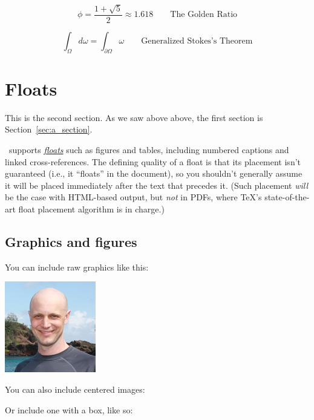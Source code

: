 \begin{equation}
\label{eq:golden_ratio}
\phi = \frac{1+\sqrt{5}}{2} \approx 1.618 \qquad{\text{The Golden Ratio}}
\end{equation}

\begin{equation}
\label{eq:stokes_theorem}
\int_\Omega d\omega = \int_{\partial\Omega} \omega \qquad{\text{Generalized Stokes's Theorem}}
\end{equation}

\section{Floats}
\label{sec:floats}

This is the second section. As we saw above above, the first section is Section~\ref{sec:a_section}.

\PolyTeXnic\ supports \href{http://en.wikibooks.org/wiki/LaTeX/Floats,_Figures_and_Captions}{\emph{floats}} such as figures and tables, including numbered captions and linked cross-references. The defining quality of a float is that its placement isn't guaranteed (i.e., it ``floats'' in the document), so you shouldn't generally assume it will be placed immediately after the text that precedes it. (Such placement \emph{will} be the case with HTML-based output, but \emph{not} in PDFs, where \TeX's state-of-the-art float placement algorithm is in charge.)

\subsection{Graphics and figures}
\label{sec:graphics_and_figures}

You can include raw graphics like this:

\includegraphics{images/2011_michael_hartl.png}

\noindent You can also include centered images:


\noindent Or include one with a box, like so:

